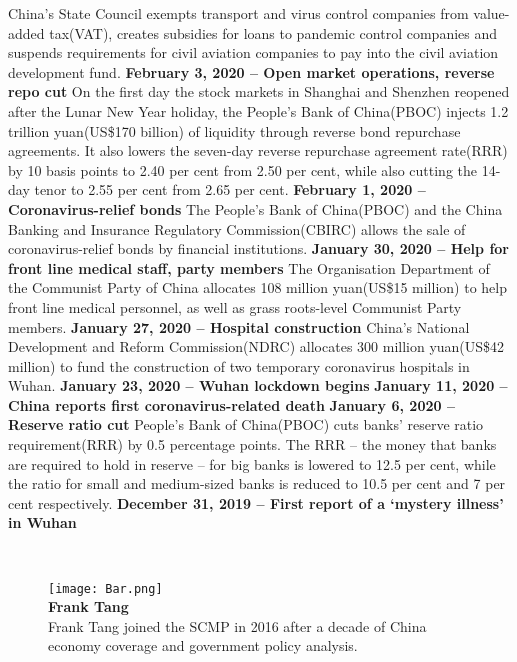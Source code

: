 \documentclass[11pt, a4paper]{article}
\newcommand{\roundpic}[4][]{
  \tikz\node [circle, minimum width = #2,
    path picture = {
      \node [#1] at(path picture bounding box.center) {
        \texttt{[image: \#4]}};
    }] {};}
\def\x{\roundpic[xshift=0cm,yshift=0cm]{1.75cm}{1.75cm}{Frank_Tang.png}}
\def\z{\parbox[t]{5.3in}{\texttt{[image: Bar.png]} \\ \textbf{Frank Tang}\\ {Frank Tang joined the SCMP in 2016 after a decade of China economy coverage and government policy analysis.}}}
\begin{document}
            \bigbreak
            China’s State Council exempts transport and virus control companies from value-added tax(VAT), creates subsidies for loans to pandemic control companies and suspends requirements for civil aviation companies to pay into the civil aviation development fund.
            \bigbreak
            \noindent
            \textbf{February 3, 2020 – Open market operations, reverse repo cut}
            \bigbreak
            On the first day the stock markets in Shanghai and Shenzhen reopened after the Lunar New Year holiday, the People’s Bank of China(PBOC) injects 1.2 trillion yuan(US\$170 billion) of liquidity through reverse bond repurchase agreements. It also lowers the seven-day reverse repurchase agreement rate(RRR) by 10 basis points to 2.40 per cent from 2.50 per cent, while also cutting the 14-day tenor to 2.55 per cent from 2.65 per cent.
            \bigbreak
            \noindent
            \textbf{February 1, 2020 – Coronavirus-relief bonds}
            \bigbreak
            The People’s Bank of China(PBOC) and the China Banking and Insurance Regulatory Commission(CBIRC) allows the sale of coronavirus-relief bonds by financial institutions.
            \bigbreak
            \noindent
            \textbf{January 30, 2020 – Help for front line medical staff, party members}
            \bigbreak
            The Organisation Department of the Communist Party of China allocates 108 million yuan(US\$15 million) to help front line medical personnel, as well as grass roots-level Communist Party members.
            \bigbreak
            \noindent
            \textbf{January 27, 2020 – Hospital construction}
            \bigbreak
            China’s National Development and Reform Commission(NDRC) allocates 300 million yuan(US\$42 million) to fund the construction of two temporary coronavirus hospitals in Wuhan.
            \bigbreak
            \noindent
            \textbf{\Large January 23, 2020 – Wuhan lockdown begins}
            \bigbreak
            \noindent
            \textbf{\Large January 11, 2020 – China reports first coronavirus-related death}
            \bigbreak
            \noindent
            \textbf{January 6, 2020 – Reserve ratio cut}
            \bigbreak
            People’s Bank of China(PBOC) cuts banks’ reserve ratio requirement(RRR) by 0.5 percentage points. The RRR – the money that banks are required to hold in reserve – for big banks is lowered to 12.5 per cent, while the ratio for small and medium-sized banks is reduced to 10.5 per cent and 7 per cent respectively.
            \bigbreak
            \noindent
            \textbf{\Large December 31, 2019 – First report of a ‘mystery illness’ in Wuhan}
            \begin{figure}[H]
                \raisebox{\baselineskip -\heightof{\x}}{\x} 
                ~\z
            \end{figure}
            \newpage
\end{document}
